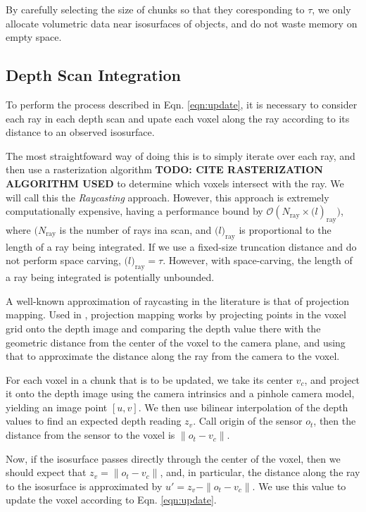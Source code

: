 \documentclass[conference,10pt]{IEEEtran}
\begin{document}
By carefully selecting the size of chunks so that they coresponding to $\tau$,
we only allocate volumetric data near isosurfaces of objects, and do not waste
memory on empty space.

\subsection{Depth Scan Integration}
To perform the process described in Eqn. \ref{eqn:update}, it is necessary
to consider each ray in each depth scan and upate each voxel
along the ray according to its distance to an observed isosurface.

The most straightfoward way of doing this is to simply iterate over each ray,
and then use a rasterization algorithm \textbf{TODO: CITE RASTERIZATION
ALGORITHM USED} to determine which voxels intersect with the ray. We will call
this the \textit{Raycasting} approach. However, this approach is extremely
computationally expensive, having a performance bound by 
$\mathcal{O}(N_{\text{ray}} \times \mathcal(l)_{\text{ray}})$, where 
$(N_{\text{ray}}$ is the number of rays ina  scan, and
$\mathcal(l)_{\text{ray}}$  is  proportional to the length of a ray being
integrated. If we use a fixed-size truncation distance and do not perform  space
carving, $\mathcal(l)_{\text{ray}} = \tau$. However, with space-carving, the
length of a ray being integrated is potentially unbounded.

A well-known approximation of raycasting in the literature is that of projection
mapping. Used in \cite{Bylow2013, Klingensmith2014}, projection mapping works by
projecting points in the voxel grid onto the depth image and comparing the depth
value there with the geometric distance from the center of the voxel to the
camera plane, and using that to approximate the distance along the ray from the
camera to the voxel.

For each voxel in a chunk that is to be updated, we take its center $v_c$, and
project it onto the depth image using the camera intrinsics and a pinhole camera
model, yielding an image point $[u, v]$. We then use bilinear interpolation of
the depth values to find an expected depth reading $z_v$. Call origin of the
sensor  $o_t$,  then the distance from the sensor to the voxel is $\|o_t -
v_c\|$. 

Now, if the isosurface passes directly through the center of the voxel,
then we should expect that $z_v = \|o_t - v_c\|$, and, in particular, the
distance along the ray to the isosurface is approximated by $u' = z_v - \|o_t -
v_c\|$. We use this value to update the voxel according to Eqn.
\ref{eqn:update}.
\end{document}
